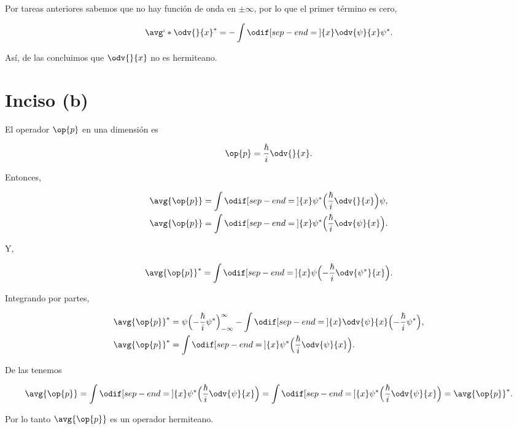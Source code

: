 \documentclass[../main.tex]{subfiles}
\begin{document}
\begin{problema}[10]
	Por tareas anteriores sabemos que no hay función de onda en \(\pm \infty\), por lo
	que el primer término es cero,

	\begin{equation}
		\avg`*{\odv{}{x}}^{*} = - \int \odif[sep-end=\medspace]{x} \odv{\psi}{x} \psi^{*}.
		\label{eq:avg-psi-star}
	\end{equation}

	Así, de las  concluimos que
	\(\odv{}{x}\) no es hermiteano.

	\section{Inciso (b)}

	El operador \(\op{p}\) en una dimensión es

	\begin{equation*}
		\op{p} = \dfrac{\hbar}{i}\odv{}{x}.
	\end{equation*}

	Entonces,

	\begin{align}
		\avg{\op{p}} & = \int \odif[sep-end=\medspace]{x} \psi^{*}\Bigl(\dfrac{\hbar}{i}\odv{}{x}\Bigr)\psi,\nonumber        \\
		\avg{\op{p}} & = \int \odif[sep-end=\medspace]{x} \psi^{*}\Bigl(\dfrac{\hbar}{i}\odv{\psi}{x}\Bigr).\label{eq:avg-p}
	\end{align}

	Y,

	\begin{equation*}
		\avg{\op{p}}^{*} = \int \odif[sep-end=\medspace]{x} \psi \Bigl(-\dfrac{\hbar}{i}\odv{\psi^{*}}{x}\Bigr).
	\end{equation*}

	Integrando por partes,

	\begin{align}
		\avg{\op{p}}^{*} & = \psi \Bigl(-\dfrac{\hbar}{i}\psi^{*}\Bigr)_{-\infty}^{\infty} - \int \odif[sep-end=\medspace]{x} \odv{\psi}{x}\Bigl(-\dfrac{\hbar}{i}\psi^{*}\Bigr),\nonumber \\
		\avg{\op{p}}^{*} & = \int \odif[sep-end=\medspace]{x} \psi^{*}\Bigl(\dfrac{\hbar}{i}\odv{\psi}{x}\Bigr). \label{eq:avg-p-star}
	\end{align}

	De las  tenemos

	\begin{equation*}
		\avg{\op{p}} = \int \odif[sep-end=\medspace]{x} \psi^{*}\Bigl(\dfrac{\hbar}{i}\odv{\psi}{x}\Bigr) = \int \odif[sep-end=\medspace]{x} \psi^{*}\Bigl(\dfrac{\hbar}{i}\odv{\psi}{x}\Bigr) = \avg{\op{p}}^{*}.
	\end{equation*}

	Por lo tanto \(\avg{\op{p}}\) es un operador hermiteano.

\end{problema}
\end{document}
